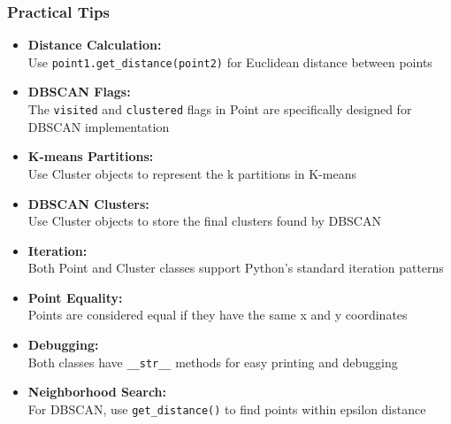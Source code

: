 \documentclass[
english,
smallborders
]{i6prcsht}
\begin{document}
\vspace*{0.5cm}

\subsubsection*{Practical Tips}

\begin{itemize}
	\item \textbf{Distance Calculation:} \\ Use \texttt{point1.get\_distance(point2)} for Euclidean distance between points
	\item \textbf{DBSCAN Flags:} \\ The \texttt{visited} and \texttt{clustered} flags in Point are specifically designed for DBSCAN implementation
	\item \textbf{K-means Partitions:} \\ Use Cluster objects to represent the k partitions in K-means
	\item \textbf{DBSCAN Clusters:} \\ Use Cluster objects to store the final clusters found by DBSCAN
	\item \textbf{Iteration:} \\ Both Point and Cluster classes support Python's standard iteration patterns
	\item \textbf{Point Equality:} \\ Points are considered equal if they have the same x and y coordinates
	\item \textbf{Debugging:} \\ Both classes have \texttt{\_\_str\_\_} methods for easy printing and debugging
	\item \textbf{Neighborhood Search:} \\ For DBSCAN, use \texttt{get\_distance()} to find points within epsilon distance
\end{itemize}

\vspace*{0.3cm}
\end{document}
